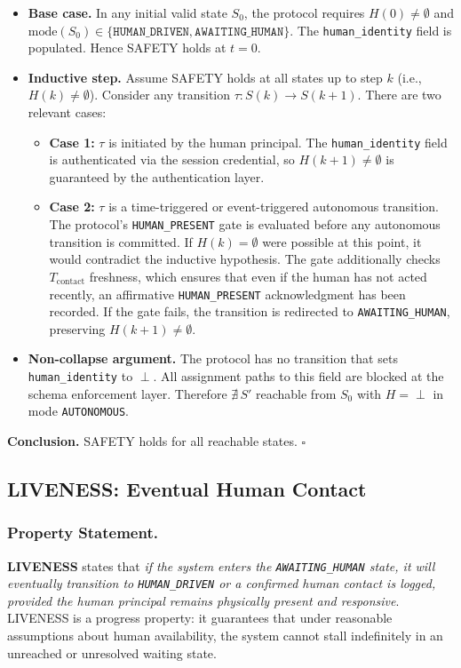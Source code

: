 \begin{itemize}
    \item \textbf{Base case.} In any initial valid state $S_0$, the protocol requires $H(0) \neq \emptyset$ and $\text{mode}(S_0) \in \{\texttt{HUMAN\_DRIVEN}, \texttt{AWAITING\_HUMAN}\}$. The \texttt{human\_identity} field is populated. Hence SAFETY holds at $t=0$.
    \item \textbf{Inductive step.} Assume SAFETY holds at all states up to step $k$ (i.e., $H(k) \neq \emptyset$). Consider any transition $\tau: S(k) \to S(k+1)$. There are two relevant cases:
    \begin{itemize}
        \item \textbf{Case 1:} $\tau$ is initiated by the human principal. The \texttt{human\_identity} field is authenticated via the session credential, so $H(k+1) \neq \emptyset$ is guaranteed by the authentication layer.
        \item \textbf{Case 2:} $\tau$ is a time-triggered or event-triggered autonomous transition. The protocol's \texttt{HUMAN\_PRESENT} gate is evaluated before any autonomous transition is committed. If $H(k) = \emptyset$ were possible at this point, it would contradict the inductive hypothesis. The gate additionally checks $T_{\text{contact}}$ freshness, which ensures that even if the human has not acted recently, an affirmative \texttt{HUMAN\_PRESENT} acknowledgment has been recorded. If the gate fails, the transition is redirected to \texttt{AWAITING\_HUMAN}, preserving $H(k+1) \neq \emptyset$.
    \end{itemize}
    \item \textbf{Non-collapse argument.} The protocol has no transition that sets \texttt{human\_identity} to $\perp$. All assignment paths to this field are blocked at the schema enforcement layer. Therefore $\nexists\, S'$ reachable from $S_0$ with $H = \perp$ in mode \texttt{AUTONOMOUS}.
\end{itemize}

\medskip
\noindent\textbf{Conclusion.} SAFETY holds for all reachable states. $\square$

\bigskip

\subsection{LIVENESS: Eventual Human Contact}
\label{subsection:liveness}

\subsubsection*{Property Statement.}
\textbf{LIVENESS} states that \emph{if the system enters the \texttt{AWAITING\_HUMAN} state, it will eventually transition to \texttt{HUMAN\_DRIVEN} or a confirmed human contact is logged, provided the human principal remains physically present and responsive}. LIVENESS is a progress property: it guarantees that under reasonable assumptions about human availability, the system cannot stall indefinitely in an unreached or unresolved waiting state.

